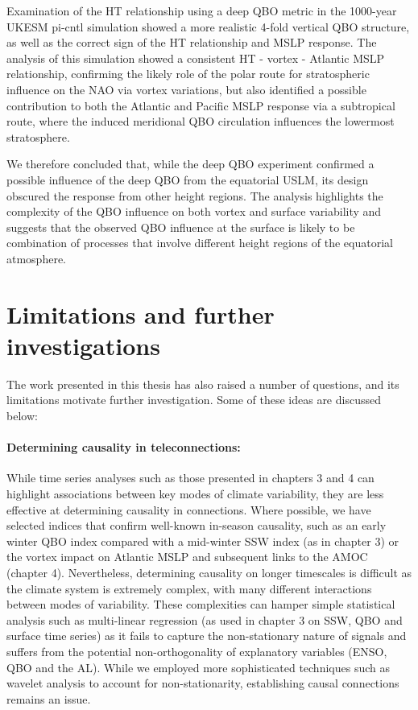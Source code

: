 Examination of the HT relationship using a deep QBO metric in the 1000-year UKESM pi-cntl simulation showed a more realistic 4-fold vertical QBO structure, as well as the correct sign of the HT relationship and MSLP response. The analysis of this simulation showed a consistent HT - vortex - Atlantic MSLP relationship, confirming the likely role of the polar route for stratospheric influence on the NAO via vortex variations, but also identified a possible contribution to both the Atlantic and Pacific MSLP response via a subtropical route, where the induced meridional QBO circulation influences the lowermost stratosphere.  

We therefore concluded that, while the deep QBO experiment confirmed a possible influence of the deep QBO from the equatorial USLM, its design obscured the response from other height regions. The analysis highlights the complexity of the QBO influence on both vortex and surface variability and suggests that the observed QBO influence at the surface is likely to be combination of processes that involve different height regions of the equatorial atmosphere.  

\section{Limitations and further investigations}
\label{sec:limitations}
The work presented in this thesis has also raised a number of questions, and its limitations motivate further investigation. Some of these ideas are discussed below:

\paragraph{Determining causality in teleconnections:}
While time series analyses such as those presented in chapters 3 and 4 can highlight associations between key modes of climate variability, they are less effective at determining causality in connections. Where possible, we have selected indices that confirm well-known in-season causality, such as an early winter QBO index compared with a mid-winter SSW index (as in chapter 3) or the vortex impact on Atlantic MSLP and subsequent links to the AMOC (chapter 4). Nevertheless, determining causality on longer timescales is difficult as the climate system is extremely complex, with many different interactions between modes of variability. These complexities can hamper simple statistical analysis such as multi-linear regression (as used in chapter 3 on SSW, QBO and surface time series) as it fails to capture the non-stationary nature of signals and suffers from the potential non-orthogonality of explanatory variables (ENSO, QBO and the AL). While we employed more sophisticated techniques such as wavelet analysis to account for non-stationarity, establishing causal connections remains an issue.

